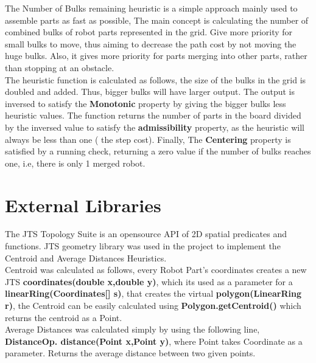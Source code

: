 The Number of Bulks remaining heuristic is a simple approach mainly used to assemble parts as fast as possible, The main concept is calculating the number of combined bulks of robot parts represented in the grid. Give more priority for small bulks to move, thus aiming to decrease the path cost by not moving the huge bulks. Also, it gives more priority for parts merging into other parts, rather than stopping at an obstacle.  \\

The heuristic function is calculated as follows, the size of the bulks in the grid is doubled and added. Thus, bigger bulks will have larger output. The output is inversed to satisfy the \textbf{Monotonic} property by giving the bigger bulks less heuristic values. The function returns the number of parts in the board divided by the inversed value to satisfy the \textbf{admissibility} property, as the heuristic will always be less than one ( the step cost). Finally, The \textbf{Centering} property is satisfied by a running check, returning a zero value if the number of bulks reaches one, i.e, there is only 1 merged robot.


\chapter{External Libraries}

The JTS Topology Suite is an opensource API of 2D spatial predicates and functions. JTS geometry library was used in the project to implement the Centroid and Average Distances Heuristics. \\

 Centroid was calculated as follows, every Robot Part's coordinates creates a new JTS \textbf{coordinates(double x,double y)}, which its used as a parameter for a \textbf{linearRing(Coordinates[] s)}, that creates the virtual \textbf{polygon(LinearRing r)}, the Centroid can be easily calculated using \textbf{Polygon.getCentroid()} which returns the centroid as a Point.\\
 
 Average Distances was calculated simply by using the following line, \textbf{DistanceOp. distance(Point x,Point y)}, where Point takes Coordinate as a parameter. Returns the average distance between two given points.
 \\
 
 
 